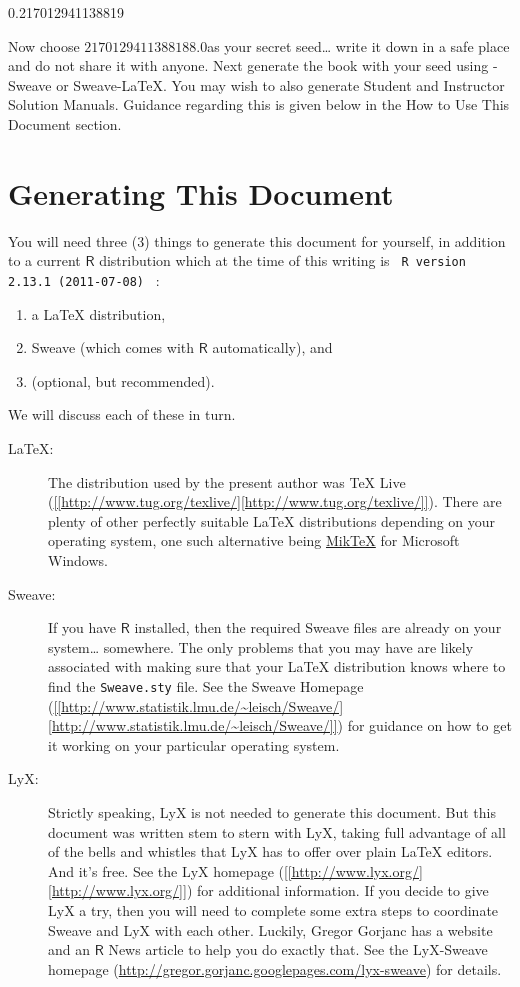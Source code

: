\documentclass[captions=tableheading]{scrbook}
\begin{document}
\begin{example}
0.217012941138819

Now choose \(  2170129411388188.0 \)as your secret seed\ldots{} write it down in a safe place and do not share it with anyone. Next generate the book with your seed using \LyX{}-Sweave or Sweave-\LaTeX{}. You may wish to also generate Student and Instructor Solution Manuals. Guidance regarding this is given below in the How to Use This Document section.
\section{Generating This Document}
\label{sec-23-1}
\label{sec-Generating-This-Document}


You will need three (3) things to generate this document for yourself, in addition to a current \(\mathsf{R}\) distribution which at the time of this writing is \texttt{  R version 2.13.1 (2011-07-08) } :
\begin{enumerate}
\item a \LaTeX{} distribution,
\item Sweave (which comes with \(\mathsf{R}\) automatically), and
\item \LyX (optional, but recommended).
\end{enumerate}

We will discuss each of these in turn.

\begin{description}
\item[\LaTeX{}:] The distribution used by the present author was \TeX{} Live (\url{[[http://www.tug.org/texlive/][http://www.tug.org/texlive/]]}). There are plenty of other perfectly suitable \LaTeX{} distributions depending on your operating system, one such alternative being \href{http://miktex.org/}{MikTeX} for Microsoft Windows.
\item[Sweave:] If you have \(\mathsf{R}\) installed, then the required Sweave files are already on your system\ldots{} somewhere. The only problems that you may have are likely associated with making sure that your \LaTeX{} distribution knows where to find the \texttt{Sweave.sty} file. See the Sweave Homepage (\url{[[http://www.statistik.lmu.de/~leisch/Sweave/][http://www.statistik.lmu.de/~leisch/Sweave/]]}) for guidance on how to get it working on your particular operating system.
\item[LyX:] Strictly speaking, LyX is not needed to generate this document. But this document was written stem to stern with LyX, taking full advantage of all of the bells and whistles that LyX has to offer over plain \LaTeX{} editors. And it's free. See the LyX homepage (\url{[[http://www.lyx.org/][http://www.lyx.org/]]}) for additional information. If you decide to give LyX a try, then you will need to complete some extra steps to coordinate Sweave and LyX with each other. Luckily, Gregor Gorjanc has a website and an \(\mathsf{R}\) News article \cite{Gorjanc2008} to help you do exactly that. See the LyX-Sweave homepage (\url{http://gregor.gorjanc.googlepages.com/lyx-sweave}) for details.
\end{description}


\end{example}
\end{document}
